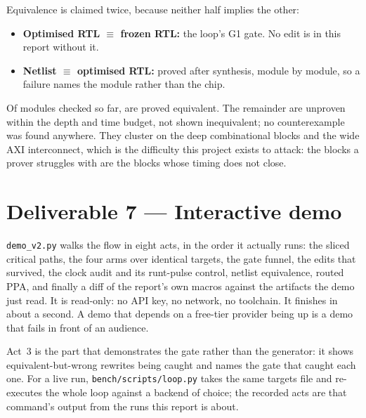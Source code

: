 \documentclass[11pt,a4paper]{article}
\begin{document}
Equivalence is claimed twice, because neither half implies the other:

\begin{itemize}
  \item \textbf{Optimised RTL $\equiv$ frozen RTL:} the loop's G1 gate. No
        edit is in this report without it.
  \item \textbf{Netlist $\equiv$ optimised RTL:} proved after synthesis,
        module by module, so a failure names the module rather than the chip.
\end{itemize}





Of \eqychecked{} modules checked so far, \eqyproved{} are proved equivalent. The
remainder are unproven within the depth and time budget, not shown
inequivalent; no counterexample was found anywhere. They cluster on the deep
combinational blocks and the wide AXI interconnect, which is the difficulty
this project exists to attack: the blocks a prover struggles with
are the blocks whose timing does not close.

\section{Deliverable 7 --- Interactive demo}
\label{sec:d7}

\texttt{demo\_v2.py} walks the flow in eight acts, in the order it actually
runs: the sliced critical paths, the four arms over identical targets, the
gate funnel, the edits that survived, the clock audit and its runt-pulse
control, netlist equivalence, routed PPA, and finally a diff of the report's
own macros against the artifacts the demo just read. It is read-only: no API
key, no network, no toolchain. It finishes in about a second. A demo that
depends on a free-tier provider being up is a demo that fails in front of an
audience.

Act~3 is the part that demonstrates the gate rather than the generator: it
shows equivalent-but-wrong rewrites being caught and names the gate that caught
each one. For a live run, \texttt{bench/scripts/loop.py} takes the same targets
file and re-executes the whole loop against a backend of choice; the recorded
acts are that command's output from the runs this report is about.

\end{document}
